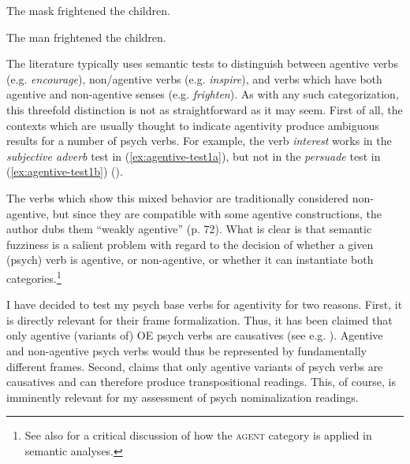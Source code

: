 \begin{exe}
	\ex \label{ex:agentive-nonagentive}
	\begin{xlist}
		\item \label{ex:nonagentive} The mask frightened the children. 
		\item \label{ex:agentive} The man frightened the children. 
	\end{xlist}
\end{exe}

\noindent The literature typically uses semantic tests to distinguish between agentive verbs (e.g. \textit{encourage}), non\-/agentive verbs (e.g. \textit{inspire}), and verbs which have both agentive and non-agentive senses (e.g. \textit{frighten}).
As with any such categorization, this threefold distinction is not as straightforward as it may seem.  
First of all, the contexts which are usually thought to indicate agentivity produce ambiguous results for a number of psych verbs. For example, the verb \textit{interest} works in the \textit{subjective adverb} test in (\ref{ex:agentive-test1a}), but not in the \textit{persuade} test in (\ref{ex:agentive-test1b}) (\citealt[73]{Martin.2013}).

\begin{exe}
	\ex \label{ex:agentive-test1}
	\begin{xlist}
	\end{xlist}
\end{exe}

\noindent The verbs which show this mixed behavior are traditionally considered non-agentive, but since they are compatible with some agentive constructions, the author dubs them ``weakly agentive'' (p. 72).
What is clear is that semantic fuzziness is a salient problem with regard to the decision of whether a given (psych) verb is agentive, or non-agentive, or whether it can instantiate both categories.\footnote{See also \citet{Huyghe.2020} for a critical discussion of how the \textsc{agent} category is applied in semantic analyses.}

I have decided to test my psych base verbs for agentivity for two reasons. First, it is directly relevant for their frame formalization. Thus, it has been claimed that only agentive (variants of) OE psych verbs are causatives (see e.g. \citealt{DiDesidero.1993,Kailuweit.2005}). Agentive and non-agentive psych verbs would thus be represented by fundamentally different frames. 
Second, \citet{Grimshaw.1990} claims that only agentive variants of psych verbs are causatives and can therefore produce transpositional readings. This, of course, is imminently relevant for my assessment of psych nominalization readings. 

